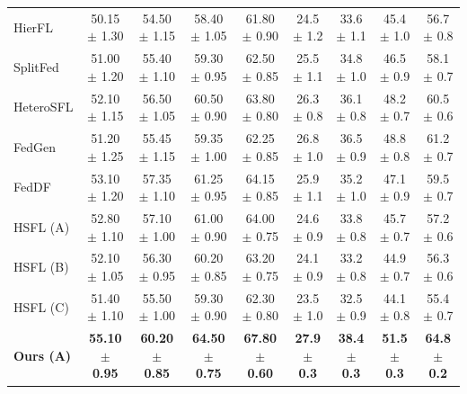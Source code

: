 \begin{table}[!ht]
{\begin{tabular}{l cccc cccc}
        HierFL & 50.15 {\scriptsize $\pm$ 1.30} & 54.50 {\scriptsize $\pm$ 1.15} & 58.40 {\scriptsize $\pm$ 1.05} & 61.80 {\scriptsize $\pm$ 0.90} & 24.5 {\scriptsize $\pm$ 1.2} & 33.6 {\scriptsize $\pm$ 1.1} & 45.4 {\scriptsize $\pm$ 1.0} & 56.7 {\scriptsize $\pm$ 0.8} \\
        SplitFed & 51.00 {\scriptsize $\pm$ 1.20} & 55.40 {\scriptsize $\pm$ 1.10} & 59.30 {\scriptsize $\pm$ 0.95} & 62.50 {\scriptsize $\pm$ 0.85} & 25.5 {\scriptsize $\pm$ 1.1} & 34.8 {\scriptsize $\pm$ 1.0} & 46.5 {\scriptsize $\pm$ 0.9} & 58.1 {\scriptsize $\pm$ 0.7} \\
        HeteroSFL & 52.10 {\scriptsize $\pm$ 1.15} & 56.50 {\scriptsize $\pm$ 1.05} & 60.50 {\scriptsize $\pm$ 0.90} & 63.80 {\scriptsize $\pm$ 0.80} & 26.3 {\scriptsize $\pm$ 0.8} & 36.1 {\scriptsize $\pm$ 0.8} & 48.2 {\scriptsize $\pm$ 0.7} & 60.5 {\scriptsize $\pm$ 0.6} \\
        FedGen & 51.20 {\scriptsize $\pm$ 1.25} & 55.45 {\scriptsize $\pm$ 1.15} & 59.35 {\scriptsize $\pm$ 1.00} & 62.25 {\scriptsize $\pm$ 0.85} & 26.8 {\scriptsize $\pm$ 1.0} & 36.5 {\scriptsize $\pm$ 0.9} & 48.8 {\scriptsize $\pm$ 0.8} & 61.2 {\scriptsize $\pm$ 0.7} \\
        FedDF & 53.10 {\scriptsize $\pm$ 1.20} & 57.35 {\scriptsize $\pm$ 1.10} & 61.25 {\scriptsize $\pm$ 0.95} & 64.15 {\scriptsize $\pm$ 0.85} & 25.9 {\scriptsize $\pm$ 1.1} & 35.2 {\scriptsize $\pm$ 1.0} & 47.1 {\scriptsize $\pm$ 0.9} & 59.5 {\scriptsize $\pm$ 0.7} \\
        \midrule
        HSFL (A) & 52.80 {\scriptsize $\pm$ 1.10} & 57.10 {\scriptsize $\pm$ 1.00} & 61.00 {\scriptsize $\pm$ 0.90} & 64.00 {\scriptsize $\pm$ 0.75} & 24.6 {\scriptsize $\pm$ 0.9} & 33.8 {\scriptsize $\pm$ 0.8} & 45.7 {\scriptsize $\pm$ 0.7} & 57.2 {\scriptsize $\pm$ 0.6} \\
        HSFL (B) & 52.10 {\scriptsize $\pm$ 1.05} & 56.30 {\scriptsize $\pm$ 0.95} & 60.20 {\scriptsize $\pm$ 0.85} & 63.20 {\scriptsize $\pm$ 0.75} & 24.1 {\scriptsize $\pm$ 0.9} & 33.2 {\scriptsize $\pm$ 0.8} & 44.9 {\scriptsize $\pm$ 0.7} & 56.3 {\scriptsize $\pm$ 0.6} \\
        HSFL (C) & 51.40 {\scriptsize $\pm$ 1.10} & 55.50 {\scriptsize $\pm$ 1.00} & 59.30 {\scriptsize $\pm$ 0.90} & 62.30 {\scriptsize $\pm$ 0.80} & 23.5 {\scriptsize $\pm$ 1.0} & 32.5 {\scriptsize $\pm$ 0.9} & 44.1 {\scriptsize $\pm$ 0.8} & 55.4 {\scriptsize $\pm$ 0.7} \\
        \midrule
        \textbf{Ours (A)} & \textbf{55.10 {\scriptsize $\pm$ 0.95}} & \textbf{60.20 {\scriptsize $\pm$ 0.85}} & \textbf{64.50 {\scriptsize $\pm$ 0.75}} & \textbf{67.80 {\scriptsize $\pm$ 0.60}} & \textbf{27.9 {\scriptsize $\pm$ 0.3}} & \textbf{38.4 {\scriptsize $\pm$ 0.3}} & \textbf{51.5 {\scriptsize $\pm$ 0.3}} & \textbf{64.8 {\scriptsize $\pm$ 0.2}} \\

\end{tabular}}
\end{table}
